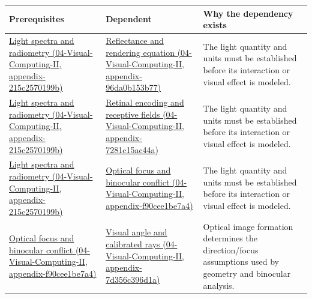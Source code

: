 {\def\LTcaptype{none} %
\begin{longtable}[]{@{}
  >{\raggedright\arraybackslash}p{}
  >{\raggedright\arraybackslash}p{}
  >{\raggedright\arraybackslash}p{}@{}}
\toprule\noalign{}
\begin{minipage}[b]{\linewidth}\raggedright
Prerequisites
\end{minipage} & \begin{minipage}[b]{\linewidth}\raggedright
Dependent
\end{minipage} & \begin{minipage}[b]{\linewidth}\raggedright
Why the dependency exists
\end{minipage} \\
\midrule\noalign{}
\endhead
\bottomrule\noalign{}
\endlastfoot
\href{../04-Visual-Computing-II/main.pdf\#nameddest=appendix-215c2570199b}{Light spectra and radiometry (04-Visual-Computing-II, appendix-215c2570199b)} & \href{../04-Visual-Computing-II/main.pdf\#nameddest=appendix-96da0b153b77}{Reflectance and rendering equation (04-Visual-Computing-II, appendix-96da0b153b77)} & The light quantity and units must be established before its interaction or visual effect is modeled. \\
\href{../04-Visual-Computing-II/main.pdf\#nameddest=appendix-215c2570199b}{Light spectra and radiometry (04-Visual-Computing-II, appendix-215c2570199b)} & \href{../04-Visual-Computing-II/main.pdf\#nameddest=appendix-7281c15ac44a}{Retinal encoding and receptive fields (04-Visual-Computing-II, appendix-7281c15ac44a)} & The light quantity and units must be established before its interaction or visual effect is modeled. \\
\href{../04-Visual-Computing-II/main.pdf\#nameddest=appendix-215c2570199b}{Light spectra and radiometry (04-Visual-Computing-II, appendix-215c2570199b)} & \href{../04-Visual-Computing-II/main.pdf\#nameddest=appendix-f90cee1be7a4}{Optical focus and binocular conflict (04-Visual-Computing-II, appendix-f90cee1be7a4)} & The light quantity and units must be established before its interaction or visual effect is modeled. \\
\href{../04-Visual-Computing-II/main.pdf\#nameddest=appendix-f90cee1be7a4}{Optical focus and binocular conflict (04-Visual-Computing-II, appendix-f90cee1be7a4)} & \href{../04-Visual-Computing-II/main.pdf\#nameddest=appendix-7d356c396d1a}{Visual angle and calibrated rays (04-Visual-Computing-II, appendix-7d356c396d1a)} & Optical image formation determines the direction/focus assumptions used by geometry and binocular analysis. \\

\end{longtable}}

